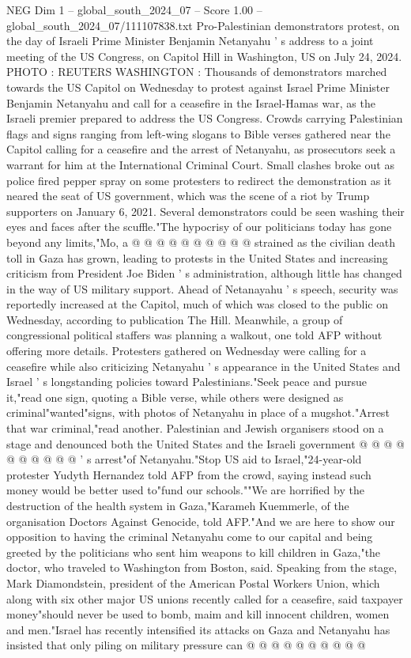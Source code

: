 \begin{textsample}{NEG Dim 1 – global\_south\_2024\_07 – Score 1.00 – global\_south\_2024\_07/111107838.txt}  \label{ex:f1_neg_396}
Pro-Palestinian demonstrators protest, on the day of Israeli Prime Minister Benjamin Netanyahu ' s address to a joint meeting of the US Congress, on Capitol Hill in Washington, US on July 24, 2024.
PHOTO : REUTERS WASHINGTON : Thousands of demonstrators marched towards the US Capitol on Wednesday to protest against Israel Prime Minister Benjamin Netanyahu and call for a ceasefire in the Israel-Hamas war, as the Israeli premier prepared to address the US Congress.
Crowds carrying Palestinian flags and signs ranging from left-wing slogans to Bible verses gathered near the Capitol calling for a ceasefire and the arrest of Netanyahu, as prosecutors seek a warrant for him at the International Criminal Court.
Small clashes broke out as police fired pepper spray on some protesters to redirect the demonstration as it neared the seat of US government, which was the scene of a riot by Trump supporters on January 6, 2021.
Several demonstrators could be seen washing their eyes and faces after the scuffle."The hypocrisy of our politicians today has gone beyond any limits,"Mo, a @ @ @ @ @ @ @ @ @ @ strained as the civilian death toll in Gaza has grown, leading to protests in the United States and increasing criticism from President Joe Biden ' s administration, although little has changed in the way of US military support.
Ahead of Netanayahu ' s speech, security was reportedly increased at the Capitol, much of which was closed to the public on Wednesday, according to publication The Hill.
Meanwhile, a group of congressional political staffers was planning a walkout, one told AFP without offering more details.
Protesters gathered on Wednesday were calling for a ceasefire while also criticizing Netanyahu ' s appearance in the United States and Israel ' s longstanding policies toward Palestinians."Seek peace and pursue it,"read one sign, quoting a Bible verse, while others were designed as criminal"wanted"signs, with photos of Netanyahu in place of a mugshot."Arrest that war criminal,"read another.
Palestinian and Jewish organisers stood on a stage and denounced both the United States and the Israeli government @ @ @ @ @ @ @ @ @ @ ' s arrest"of Netanyahu."Stop US aid to Israel,"24-year-old protester Yudyth Hernandez told AFP from the crowd, saying instead such money would be better used to"fund our schools.""We are horrified by the destruction of the health system in Gaza,"Karameh Kuemmerle, of the organisation Doctors Against Genocide, told AFP."And we are here to show our opposition to having the criminal Netanyahu come to our capital and being greeted by the politicians who sent him weapons to kill children in Gaza,"the doctor, who traveled to Washington from Boston, said.
Speaking from the stage, Mark Diamondstein, president of the American Postal Workers Union, which along with six other major US unions recently called for a ceasefire, said taxpayer money"should never be used to bomb, maim and kill innocent children, women and men."Israel has recently intensified its attacks on Gaza and Netanyahu has insisted that only piling on military pressure can @ @ @ @ @ @ @ @ @ @

\end{textsample}
